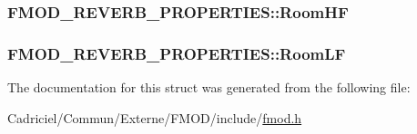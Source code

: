 \hypertarget{struct_f_m_o_d___r_e_v_e_r_b___p_r_o_p_e_r_t_i_e_s_ae4a836dcc26f48773d51c6e40db286a4}{
\subsubsection[{Room\-H\-F}]{ F\-M\-O\-D\-\_\-\-R\-E\-V\-E\-R\-B\-\_\-\-P\-R\-O\-P\-E\-R\-T\-I\-E\-S\-::\-Room\-H\-F}}\label{struct_f_m_o_d___r_e_v_e_r_b___p_r_o_p_e_r_t_i_e_s_ae4a836dcc26f48773d51c6e40db286a4}
\hypertarget{struct_f_m_o_d___r_e_v_e_r_b___p_r_o_p_e_r_t_i_e_s_ae07d419ed7e08ea376081b59798f7b1c}{
\subsubsection[{Room\-L\-F}]{ F\-M\-O\-D\-\_\-\-R\-E\-V\-E\-R\-B\-\_\-\-P\-R\-O\-P\-E\-R\-T\-I\-E\-S\-::\-Room\-L\-F}}\label{struct_f_m_o_d___r_e_v_e_r_b___p_r_o_p_e_r_t_i_e_s_ae07d419ed7e08ea376081b59798f7b1c}


The documentation for this struct was generated from the following file\-:\begin{DoxyCompactItemize}
\item 
Cadriciel/\-Commun/\-Externe/\-F\-M\-O\-D/include/\hyperlink{fmod_8h}{fmod.\-h}\end{DoxyCompactItemize}
